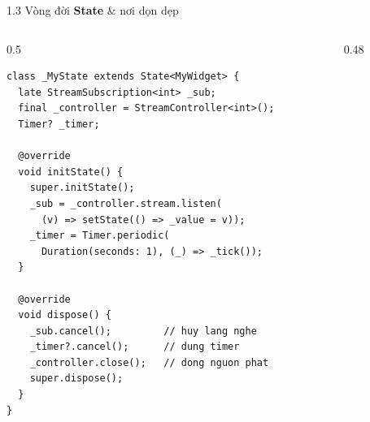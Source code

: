 \documentclass[aspectratio=169,10pt]{beamer}
\begin{document}
\begin{frame}[fragile]{1.3 Vòng đời \textbf{State} \& nơi dọn dẹp}
  \begin{columns}[T]
    \begin{column}{0.5\textwidth}
\begin{lstlisting}
class _MyState extends State<MyWidget> {
  late StreamSubscription<int> _sub;
  final _controller = StreamController<int>();
  Timer? _timer;

  @override
  void initState() {
    super.initState();
    _sub = _controller.stream.listen(
      (v) => setState(() => _value = v));
    _timer = Timer.periodic(
      Duration(seconds: 1), (_) => _tick());
  }

  @override
  void dispose() {
    _sub.cancel();         // huy lang nghe
    _timer?.cancel();      // dung timer
    _controller.close();   // dong nguon phat
    super.dispose();
  }
}
\end{lstlisting}
    \end{column}
    \begin{column}{0.48\textwidth}
      \centering
    \end{column}
  \end{columns}
\end{frame}
\end{document}
